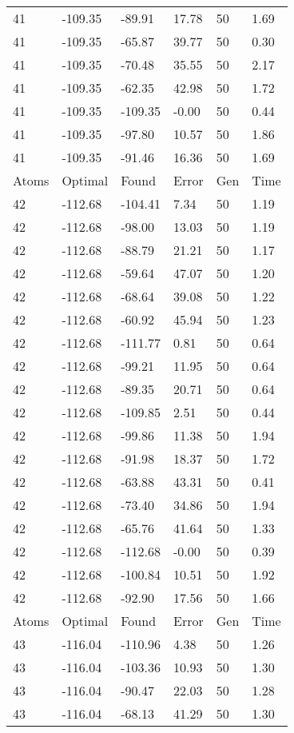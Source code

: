 \documentclass{report}
\begin{document}
\begin{appendix}
\begin{longtable}{llllll}
41 & -109.35 & -89.91 & 17.78 & 50 & 1.69 \\
41 & -109.35 & -65.87 & 39.77 & 50 & 0.30 \\
41 & -109.35 & -70.48 & 35.55 & 50 & 2.17 \\
41 & -109.35 & -62.35 & 42.98 & 50 & 1.72 \\
41 & -109.35 & -109.35 & -0.00 & 50 & 0.44 \\
41 & -109.35 & -97.80 & 10.57 & 50 & 1.86 \\
41 & -109.35 & -91.46 & 16.36 & 50 & 1.69 \\
Atoms & Optimal & Found & Error & Gen & Time \\
42 & -112.68 & -104.41 & 7.34 & 50 & 1.19 \\
42 & -112.68 & -98.00 & 13.03 & 50 & 1.19 \\
42 & -112.68 & -88.79 & 21.21 & 50 & 1.17 \\
42 & -112.68 & -59.64 & 47.07 & 50 & 1.20 \\
42 & -112.68 & -68.64 & 39.08 & 50 & 1.22 \\
42 & -112.68 & -60.92 & 45.94 & 50 & 1.23 \\
42 & -112.68 & -111.77 & 0.81 & 50 & 0.64 \\
42 & -112.68 & -99.21 & 11.95 & 50 & 0.64 \\
42 & -112.68 & -89.35 & 20.71 & 50 & 0.64 \\
42 & -112.68 & -109.85 & 2.51 & 50 & 0.44 \\
42 & -112.68 & -99.86 & 11.38 & 50 & 1.94 \\
42 & -112.68 & -91.98 & 18.37 & 50 & 1.72 \\
42 & -112.68 & -63.88 & 43.31 & 50 & 0.41 \\
42 & -112.68 & -73.40 & 34.86 & 50 & 1.94 \\
42 & -112.68 & -65.76 & 41.64 & 50 & 1.33 \\
42 & -112.68 & -112.68 & -0.00 & 50 & 0.39 \\
42 & -112.68 & -100.84 & 10.51 & 50 & 1.92 \\
42 & -112.68 & -92.90 & 17.56 & 50 & 1.66 \\
Atoms & Optimal & Found & Error & Gen & Time \\
43 & -116.04 & -110.96 & 4.38 & 50 & 1.26 \\
43 & -116.04 & -103.36 & 10.93 & 50 & 1.30 \\
43 & -116.04 & -90.47 & 22.03 & 50 & 1.28 \\
43 & -116.04 & -68.13 & 41.29 & 50 & 1.30 \\

\end{longtable}
\end{appendix}
\end{document}
